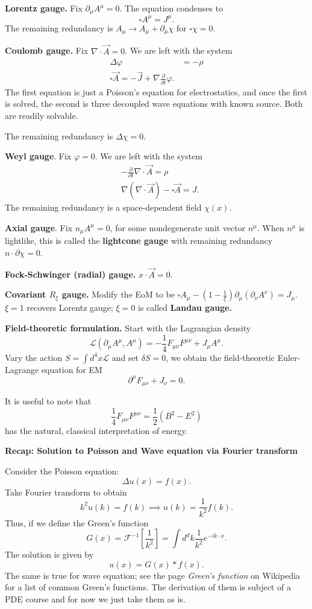 \textbf{Lorentz gauge.} Fix $\partial_ \mu A^\mu = 0$. The equation condenses to
\[
	\square A^ \mu = J^ \mu
.\] 
The remaining redundancy is $A_ \mu \to  A_ \mu + \partial_ \mu \chi$ for $\square \chi = 0$.

\textbf{Coulomb gauge.} Fix $\nabla \cdot \vec{A}  = 0$. We are left with the system
\begin{align*}
	\Delta \varphi &= - \rho\\
	\square \vec{A} = - \vec{J} + \nabla \frac{\partial }{\partial t} \varphi
.\end{align*} 
The first equation is just a Poisson's equation for electrostatics, and once the first is solved, the second is three decoupled wave equations with known source. Both are readily solvable.

The remaining redundancy is $\Delta \chi = 0$.

\textbf{Weyl gauge}. Fix $\varphi = 0$. We are left with the system
\begin{align*}
	&- \frac{\partial }{\partial t} \nabla \cdot \vec{A}  = \rho \\
	&\nabla (\nabla  \cdot \vec{A} ) - \square \vec{A}  = J
.\end{align*}
The remaining redundancy is a space-dependent field $\chi(x)$.

\textbf{Axial gauge}. Fix $n_ \mu A^ \mu = 0$, for some nondegenerate unit vector $n^ \mu$. When $n^ \mu$ is lightlike, this is called the \textbf{lightcone gauge} with remaining redundancy $n \cdot \partial \chi = 0$.

\textbf{Fock-Schwinger (radial) gauge.} $x \cdot \vec{A}  = 0$.

\textbf{Covariant $R_ \xi$ gauge.} Modify the EoM to be $\square A_ \mu - (1 - \frac{1}{\xi}) \partial _ \mu (\partial_ \nu A^\nu) = J_ \mu.$ $\xi = 1$ recovers Lorentz gauge; $\xi = 0$ is called \textbf{Landau gauge.}


\textbf{Field-theoretic formulation.}
Start with the Lagrangian density
\[
	\mathcal{L}(\partial_ \mu A^\mu, A^\mu) = - \frac{1}{4} F_{ \mu \nu} F^{\mu \nu} + J_ \mu A^ \mu
.\] 
Vary the action $S = \int d^4 x \mathcal{L}$ and set $\delta S = 0$, we obtain the field-theoretic Euler-Lagrange equation for EM
\[
	\partial^\mu F_{\mu \nu} + J_ \nu = 0
.\] 

It is useful to note that
\[
	\frac{1}{4}F_{\mu \nu} F^{\mu \nu} = \frac{1}{2} (B^2 - E^2)
\] 
has the natural, classical interpretation of energy.

\textbf{Recap: Solution to Poisson and Wave equation via Fourier transform}

Consider the Poisson equation:
\[
	\Delta u(x) = f(x)
.\] 
Take Fourier transform to obtain
\[
	k^2 u(k) = f(k) \implies u(k) = \frac{1}{k^2} f(k)
.\] 
Thus, if we define the Green's function
\[
	G(x)=\mathcal{F}^{-1}[\frac{1}{k^2}] = \int d^d k \frac{1}{k^2} e^{- i k\cdot x}
.\] 
The solution is given by
\[
	u(x) = G(x) * f(x)
.\]
The same is true for wave equation; see the page \textit{Green's function} on Wikipedia for a list of common Green's functions. The derivation of them is subject of a PDE course and for now we just take them as is.

